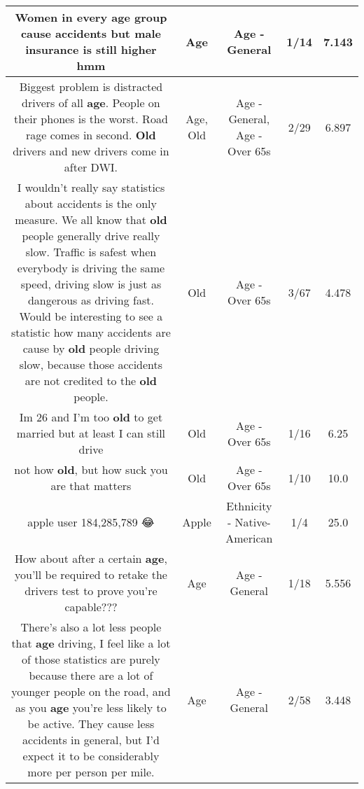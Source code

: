 \documentclass[11pt]{article}
\newlength\mylength
\begin{document}
\begin{center}
\begin{longtable}{|C{.65\mylength}|C{.30\mylength}|C{.12\mylength}|C{.12\mylength}|C{.12\mylength}|}
  \small Women in every \textbf{age} group cause accidents but male insurance is still higher hmm\normalsize   & Age & Age - General & 1/14 & 7.143 \\  \hline
  \small Biggest problem is distracted drivers of all \textbf{age}. People on their phones is the worst. Road rage comes in second. \textbf{Old} drivers and new drivers come in after DWI.\normalsize   & Age, Old & Age - General, Age - Over 65s & 2/29 & 6.897 \\  \hline
  \small I wouldn't really say statistics about accidents is the only measure. We all know that \textbf{old} people generally drive really slow. Traffic is safest when everybody is driving the same speed, driving slow is just as dangerous as driving fast. Would be interesting to see a statistic how many accidents are cause by \textbf{old} people driving slow, because those accidents are not credited to the \textbf{old} people.\normalsize   & Old & Age - Over 65s & 3/67 & 4.478 \\  \hline
  \small Im 26 and I'm too \textbf{old} to get married but at least I can still  drive\normalsize   & Old & Age - Over 65s & 1/16 & 6.25 \\  \hline
  \small not how \textbf{old}, but how suck you are that matters\normalsize   & Old & Age - Over 65s & 1/10 & 10.0 \\  \hline
  \small apple user 184,285,789 😂\normalsize   & Apple & Ethnicity - Native-American & 1/4 & 25.0 \\  \hline
  \small How about after a certain \textbf{age}, you'll be required to retake the drivers test to prove you're capable???\normalsize   & Age & Age - General & 1/18 & 5.556 \\  \hline
  \small There's also a lot less people that \textbf{age} driving, I feel like a lot of those statistics are purely because there are a lot of younger people on the road, and as you \textbf{age} you're less likely to be active. They cause less accidents in general, but I'd expect it to be considerably more per person per mile.\normalsize   & Age & Age - General & 2/58 & 3.448 \\  \hline

\end{longtable}
\end{center}
\end{document}
